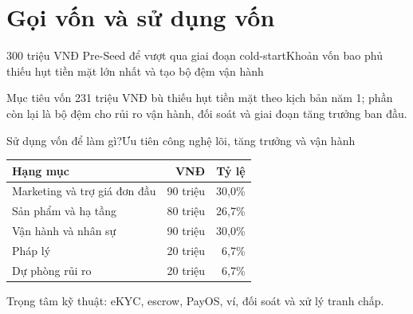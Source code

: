 \section{Gọi vốn và sử dụng vốn}

\begin{frame}{300 triệu VNĐ Pre-Seed để vượt qua giai đoạn cold-start}{Khoản vốn bao phủ thiếu hụt tiền mặt lớn nhất và tạo bộ đệm vận hành}
  \centering
  \vspace{1em}
  \begin{block}{Mục tiêu vốn}
    231 triệu VNĐ bù thiếu hụt tiền mặt theo kịch bản năm 1; phần còn lại là bộ đệm cho rủi ro vận hành, đối soát và giai đoạn tăng trưởng ban đầu.
  \end{block}
\end{frame}

\begin{frame}{Sử dụng vốn để làm gì?}{Ưu tiên công nghệ lõi, tăng trưởng và vận hành}
  \centering\small
  \begin{tabularx}{.9\textwidth}{@{}Xrr@{}}
    \toprule
    \textbf{Hạng mục} & \textbf{VNĐ} & \textbf{Tỷ lệ} \\
    \midrule
    Marketing và trợ giá đơn đầu & 90 triệu & 30,0\% \\
    Sản phẩm và hạ tầng & 80 triệu & 26,7\% \\
    Vận hành và nhân sự & 90 triệu & 30,0\% \\
    Pháp lý & 20 triệu & 6,7\% \\
    Dự phòng rủi ro & 20 triệu & 6,7\% \\
    \bottomrule
  \end{tabularx}
  \par\vspace{.6em}
  \scriptsize Trọng tâm kỹ thuật: eKYC, escrow, PayOS, ví, đối soát và xử lý tranh chấp.
\end{frame}

